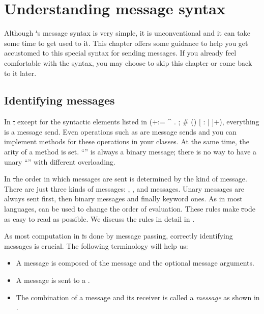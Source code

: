 \documentclass[a4paper,10pt,twoside]{book}
\begin{document}
	\renewcommand{\nnbb}[2]{} %
\fi
\chapter{Understanding message syntax}
\label{cha:understanding}

Although \st's message syntax is very simple, it is unconventional and it can take some time to get used to it.
This chapter offers some guidance to help you get accustomed to this special syntax for sending messages.
If you already feel comfortable with the syntax, you may choose to skip this chapter or come back to it later.

\section{Identifying messages}

In \st, except for the syntactic elements listed in  (\ct+:= ^ . ; # () {} [ : | ]+), everything is a message send. 
Even operations such as \ct{+} are message sends and you can implement methods for these operations in your classes.
At the same time, the arity of a method is set.
``\ct{-}'' is always a binary message; there is no way to have a unary ``\ct{-}'' with different overloading.

In \st the order in which messages are sent is determined by the kind of message.
There are just three kinds of messages: , , and  messages.
Unary messages are always sent first, then binary messages and finally keyword ones.
As in most languages,  can be used to change the order of evaluation.
These rules make \st code as easy to read as possible.
We discuss the rules in detail in .

As most computation in \st is done by message passing, correctly identifying messages is crucial.
The following terminology will help us:

\begin{itemize}
  \item A message is composed of the message  and the optional message arguments.
  \item A message is sent to a .
  \item The combination of a message and its receiver is called a \emph{message}  as shown in .
\end{itemize}
\end{document}
